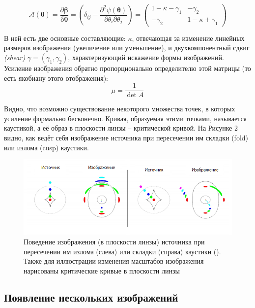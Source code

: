\begin{equation}
\mathcal{A}(\boldsymbol{\theta})=\frac{\partial \boldsymbol{\beta}}{\partial \boldsymbol{\theta}}=\left(\delta_{i j}-\frac{\partial^{2} \psi(\boldsymbol{\theta})}{\partial \theta_{i} \partial \theta_{j}}\right)=\left(\begin{array}{cc}{1-\kappa-\gamma_{1}} & {-\gamma_{2}} \\ {-\gamma_{2}} & {1-\kappa+\gamma_{1}}\end{array}\right)
\end{equation}

В ней есть две основные составляющие: $\kappa$, отвечающая за изменение линейных размеров изображения (увеличение или уменьшение), и двухкомпонентный сдвиг \textit{(shear)} $\gamma=(\gamma_1,\gamma_2)$, характеризующий искажение формы изображений. Усиление изображения обратно пропорционально определителю этой матрицы (то есть якобиану этого отображения):
\begin{equation}
\mu=\frac{1}{\operatorname{det} A}
\end{equation}

Видно, что возможно существование некоторого множества точек, в которых усиление формально бесконечно. Кривая, образуемая этими точками, называется каустикой, а её образ в плоскости линзы – критической кривой. На Рисунке 2 видно, как ведёт себя изображение источника при пересечении им складки (fold) или излома (cusp) каустики.
 
\begin{figure}[H]
    \centering
	\includegraphics[scale=0.8]{pics/caust_intro.png}
	\caption{Поведение изображения (в плоскости линзы) источника при пересечении им излома (слева) или складки (справа) каустики  (\cite{narbart}). Также для иллюстрации изменения масштабов изображения нарисованы критические кривые в плоскости линзы}
\end{figure}

\subsection{Появление нескольких изображений}

